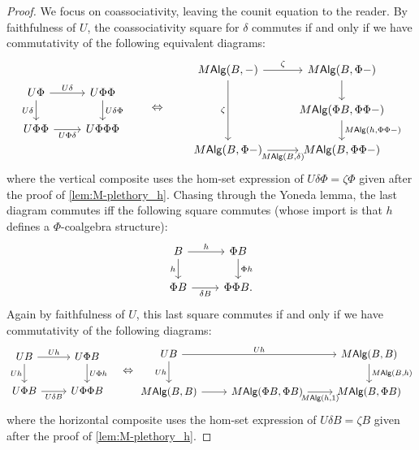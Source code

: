 \documentclass[12pt,reqno]{amsart}
\theoremstyle{plain}
\theoremstyle{definition}
\theoremstyle{remark}
\newcommand{\namedcat}[1]{\mathsf{#1}}
\newcommand{\Alg}{\namedcat{Alg}}
\numberwithin{thm}{section}
\begin{document}
\begin{proof}
    We focus on coassociativity, leaving the counit equation to the reader. By faithfulness of $U$, the coassociativity square for $\delta$ commutes if and only if we have commutativity of the following equivalent diagrams: 
    \[
    \begin{tikzcd} 
        U\Phi 
        \arrow[r, "U\delta"] 
        \arrow[d, "U\delta", swap] 
        & 
        U\Phi\Phi 
        \arrow[d, "U\delta\Phi"] 
        \\
        U\Phi\Phi 
        \arrow[r, "U\Phi\delta", swap] 
        & 
        U\Phi\Phi\Phi
    \end{tikzcd} 
    \qquad \Leftrightarrow \qquad 
    \begin{tikzcd}
        M\Alg(B, -) 
        \arrow[r, "\zeta"] 
        \arrow[dd, "\zeta", swap]
        & 
        M\Alg(B, \Phi -) 
        \arrow[d] 
        \\& 
        M\Alg(\Phi B, \Phi\Phi -) 
        \arrow[d, "{M\Alg(h, \Phi\Phi -)}"] 
        \\
        M\Alg(B, \Phi -) 
        \arrow[swap, r, "{M\Alg(B, \delta)}"] 
        & 
        M\Alg(B, \Phi\Phi -)
    \end{tikzcd}
    \]
    where the vertical composite uses the hom-set expression of $U\delta \Phi = \zeta \Phi$ given after the proof of \cref{lem:M-plethory_h}. Chasing through the Yoneda lemma, the last diagram commutes iff the following square commutes (whose import is that $h$ defines a $\Phi$-coalgebra structure): 
    \[
    \begin{tikzcd}
        B 
        \arrow[r, "h"] 
        \arrow[d, "h", swap] 
        & 
        \Phi B 
        \arrow[d, "\Phi h"] 
        \\
        \Phi B 
        \arrow[r, "\delta B", swap] 
        & 
        \Phi\Phi B.
    \end{tikzcd}
    \] 
    Again by faithfulness of $U$, this last square commutes if and only if we have commutativity of the following diagrams: 
    \[
    \begin{tikzcd}
        UB 
        \arrow[r, "Uh"] 
        \arrow[d, "Uh", swap] 
        & 
        U\Phi B 
        \arrow[d, "U\Phi h"] 
        \\ 
        U\Phi B 
        \arrow[r, "U\delta B", swap] 
        & 
        U\Phi\Phi B
    \end{tikzcd}
    \quad
    \Leftrightarrow
    \begin{tikzcd}
        UB 
        \arrow[rr, "Uh"] 
        \arrow[d, "Uh", swap] 
        && 
        M\Alg(B, B) 
        \arrow[d, "{M\Alg(B, h)}"] 
        \\ 
        M\Alg(B, B) 
        \arrow[r] 
        &
        M\Alg(\Phi B, \Phi B) 
        \arrow[r, "{M\Alg(h, 1)}", swap] 
        &
        M\Alg(B, \Phi B)
    \end{tikzcd}
    \]
    where the horizontal composite uses the hom-set expression of $U\delta B = \zeta B$ given after the proof of \cref{lem:M-plethory_h}. 
    

\end{proof}
\end{document}
